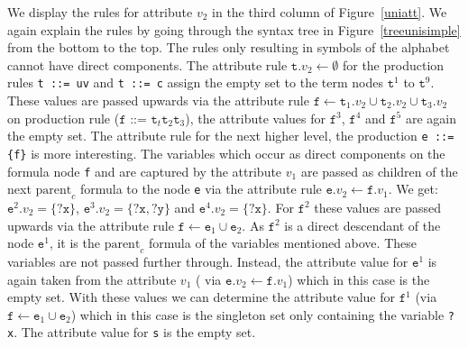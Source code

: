 We display the rules for attribute $v_2$ in the third column of Figure~\ref{uniatt}. 
We again explain the rules by going through the syntax tree in Figure~\ref{treeunisimple} from the bottom to the top. %
The rules only resulting in symbols of the alphabet cannot have direct components. %
The attribute rule $\texttt{t}.v_2\leftarrow \emptyset$ for the production rules \texttt{t~::=~uv} and \texttt{t~::=~c} assign the empty set to the term nodes
$\texttt{t}^1$ to $\texttt{t}^9$.
These values are passed upwards via the attribute rule $\texttt{f}\leftarrow \texttt{t}_1.v_2\cup \texttt{t}_2.v_2 \cup \texttt{t}_3.v_2$ 
on production rule ($\texttt{f ::= t}_t \texttt{t}_2 \texttt{t}_3$), 
the attribute values for $\texttt{f}^3$, $\texttt{f}^4$ and $\texttt{f}^5$ are again the empty set.
The attribute rule for the next higher level, the production \texttt{e ::= \{f\}} is more interesting. 
The variables which occur as direct components on the formula node \texttt{f} and are captured by the attribute $v_1$
are passed as children of the next $\text{parent}_c$ formula to the node \texttt{e} via the attribute rule $\texttt{e}.v_2\leftarrow \texttt{f}.v_1$. We get: 
$\texttt{e}^2.v_2 =\{\texttt{?x}\}$,
$\texttt{e}^3.v_2 =\{\texttt{?x}, \texttt{?y}\}$ and
$\texttt{e}^4.v_2 =\{\texttt{?x}\}
$.
For $\texttt{f}^2$ these values are passed upwards via the attribute rule $\texttt{f}\leftarrow \texttt{e}_1 \cup \texttt{e}_2$.
As $\texttt{f}^2$ is a direct descendant  of the node $\texttt{e}^1$, it is the $\text{parent}_c$ formula of the variables mentioned above. 
These variables are not passed further through. Instead, the attribute value for $\texttt{e}^1$ is again taken from the attribute $v_1$
( via $\texttt{e}.v_2\leftarrow \texttt{f}.v_1$) which in this case is the empty set.
With these values we can determine the attribute value for $\texttt{f}^1$ (via $\texttt{f}\leftarrow \texttt{e}_1 \cup \texttt{e}_2$) which in this case is 
the singleton set only containing the variable \texttt{?x}.
The attribute value for \texttt{s} is the empty set. 

